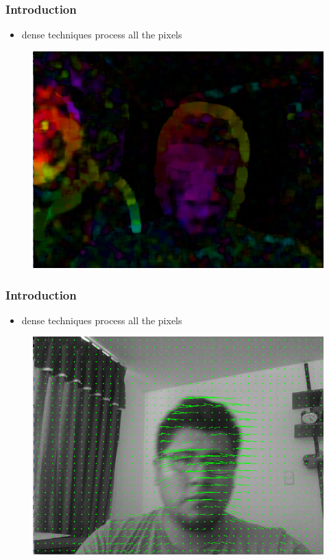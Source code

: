 \documentclass{beamer}
\begin{document}
\begin{frame}
\frametitle{Introduction}
\begin{itemize}
\item  dense techniques process all the pixels
\end{itemize}
\begin{figure}
\includegraphics[width=0.8\linewidth]{img2/Dense_optical_flow_by_HSV_color_image.png}
\end{figure}

\end{frame}


\begin{frame}
\frametitle{Introduction}
\begin{itemize}
\item  dense techniques process all the pixels
\end{itemize}

\begin{figure}
\includegraphics[width=0.8\linewidth]{img2/Dense_optical_flow_by_lines.png}
\end{figure}


\end{frame}
\end{document}
